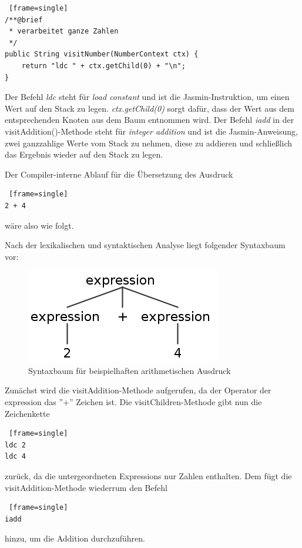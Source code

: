 \begin{lstlisting} [frame=single]
/**@brief
 * verarbeitet ganze Zahlen
 */
public String visitNumber(NumberContext ctx) {
	return "ldc " + ctx.getChild(0) + "\n";
}
\end{lstlisting}

Der Befehl \textit{ldc} steht für \textit{load constant} und ist die Jasmin-Instruktion, um einen Wert auf den Stack zu legen. \textit{ctx.getChild(0)} sorgt dafür, dass der Wert aus dem entsprechenden Knoten aus dem Baum entnommen wird.
Der Befehl \textit{iadd} in der visitAddition()-Methode steht für \textit{integer addition} und ist die Jasmin-Anweisung, zwei ganzzahlige Werte vom Stack zu nehmen, diese zu addieren und schließlich das Ergebnis wieder auf den Stack zu legen.

\pagebreak

Der Compiler-interne Ablauf für die Übersetzung des Ausdruck 
\begin{lstlisting} [frame=single]
2 + 4
\end{lstlisting}
wäre also wie folgt.

Nach der lexikalischen und syntaktischen Analyse liegt folgender Syntaxbaum vor:

\begin{figure}[h!]
\centering
\includegraphics[scale=0.4]{pics/antlr4_parse_tree_visitAdditionVisitNumberBeispiel.png}
\caption{Syntaxbaum für beispielhaften arithmetischen Ausdruck}
\label{fig:method}
\end{figure}

Zunächst wird die visitAddition-Methode aufgerufen, da der Operator der expression das ''+'' Zeichen ist. Die visitChildren-Methode gibt nun die Zeichenkette
\begin{lstlisting} [frame=single]
ldc 2
ldc 4
\end{lstlisting}
zurück, da die untergeordneten Expressions nur Zahlen enthalten. Dem fügt die visitAddition-Methode wiederrum den Befehl
\begin{lstlisting} [frame=single]
iadd
\end{lstlisting}
hinzu, um die Addition durchzuführen.
\linebreak

